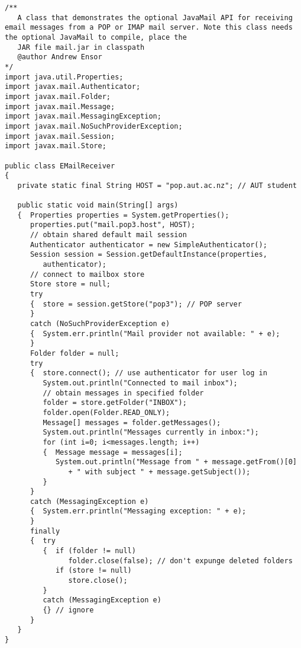 \begin{lstlisting}[caption=JavaMail API]
/**
   A class that demonstrates the optional JavaMail API for receiving email messages from a POP or IMAP mail server. Note this class needs the optional JavaMail to compile, place the
   JAR file mail.jar in classpath
   @author Andrew Ensor
*/
import java.util.Properties;
import javax.mail.Authenticator;
import javax.mail.Folder;
import javax.mail.Message;
import javax.mail.MessagingException;
import javax.mail.NoSuchProviderException;
import javax.mail.Session;
import javax.mail.Store;

public class EMailReceiver
{
   private static final String HOST = "pop.aut.ac.nz"; // AUT student

   public static void main(String[] args)
   {  Properties properties = System.getProperties();
      properties.put("mail.pop3.host", HOST);
      // obtain shared default mail session
      Authenticator authenticator = new SimpleAuthenticator();
      Session session = Session.getDefaultInstance(properties,
         authenticator);
      // connect to mailbox store
      Store store = null;
      try
      {  store = session.getStore("pop3"); // POP server
      }
      catch (NoSuchProviderException e)
      {  System.err.println("Mail provider not available: " + e);
      }
      Folder folder = null;
      try
      {  store.connect(); // use authenticator for user log in
         System.out.println("Connected to mail inbox");
         // obtain messages in specified folder
         folder = store.getFolder("INBOX");
         folder.open(Folder.READ_ONLY);
         Message[] messages = folder.getMessages();
         System.out.println("Messages currently in inbox:");
         for (int i=0; i<messages.length; i++)
         {  Message message = messages[i];
            System.out.println("Message from " + message.getFrom()[0]
               + " with subject " + message.getSubject());
         }
      }
      catch (MessagingException e)
      {  System.err.println("Messaging exception: " + e);
      }
      finally
      {  try
         {  if (folder != null)
               folder.close(false); // don't expunge deleted folders
            if (store != null)
               store.close();
         }
         catch (MessagingException e)
         {} // ignore
      }
   }
}
\end{lstlisting}
